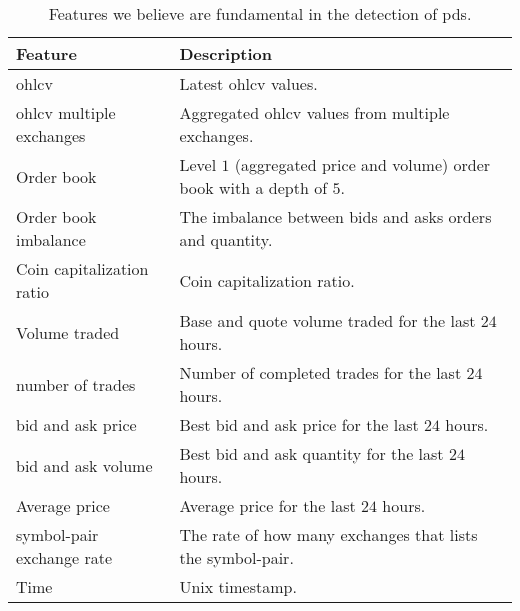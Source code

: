 \begin{table}[ht]
    \centering
    \begin{tabular}{p{} p{}}
        \hline
        \textbf{Feature} & \textbf{Description}\\
        \hline
        \ac{ohlcv}                      & Latest \ac{ohlcv} values.\\
        \hline
        \ac{ohlcv} multiple exchanges   & Aggregated \ac{ohlcv} values from multiple exchanges.\\
        \hline
        Order book                      & Level $1$ (aggregated price and volume) order book with a depth of $5$.\\
        \hline
        Order book imbalance            & The imbalance between bids and asks orders and quantity.\\
        \hline
        Coin capitalization ratio       & Coin capitalization ratio.\\
        \hline
        Volume traded                   & Base and quote volume traded for the last $24$ hours.\\
        \hline
        number of trades                & Number of completed trades for the last $24$ hours.\\      
        \hline
        bid and ask price               & Best bid and ask price for the last $24$ hours.\\
        \hline
        bid and ask volume              & Best bid and ask quantity for the last $24$ hours.\\
        \hline
        Average price                   & Average price for the last $24$ hours.\\
        \hline
        symbol-pair exchange rate       & The rate of how many exchanges that lists the symbol-pair.\\ 
        \hline
        Time                            & Unix timestamp.\\
        \hline
    \end{tabular}
    \caption[Features description]{Features we believe are fundamental in the detection of \aclp{pd}.}
    \label{tab:features}
\end{table}

